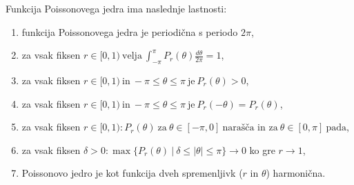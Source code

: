 \documentclass[mat1]{fmfdelo}
\begin{document}
    \begin{trditev}
        \label{lastpk}
        Funkcija Poissonovega jedra ima naslednje lastnosti:
        \begin{enumerate}
            \item funkcija Poissonovega jedra je periodična s periodo $2\pi$, 
            \item za vsak fiksen $r \in [0,1)~\text{velja}~\int_{-\pi}^{\pi}{P_r(\theta) \frac{d\theta}{2\pi}} = 1$,
            \item za vsak fiksen $r \in [0,1)~\text{in}~-\pi \leq \theta \leq \pi~\text{je}~P_r(\theta) > 0$,
            \item za vsak fiksen $r \in [0,1)~\text{in}~-\pi \leq \theta \leq \pi~\text{je}~P_r( - \theta) = P_r(\theta)$,
            \item za vsak fiksen $r \in [0,1): P_r(\theta)~\text{za}~\theta \in [-\pi, 0 ]~\text{narašča in za}~\theta \in [0, \pi ]~\text{pada}$,
            \item za vsak fiksen $\delta > 0: \max\{P_r(\theta)~|~ \delta \leq |\theta| \leq \pi\} \to 0$ ko gre $r \to 1$,
            \item Poissonovo jedro je kot funkcija dveh spremenljivk ($r$ in $\theta$) harmonična.
        \end{enumerate}
    \end{trditev}
\end{document}
